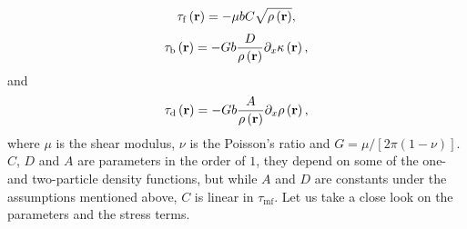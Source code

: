 \begin{equation} \label{eq:flow_stress}
{\tau _{\rm{f}}}\left( {\mathbf{r}} \right) =  - \mu bC\sqrt {\rho \left( {\mathbf{r}} \right)},
\end{equation}
\begin{equation}\label{eq:back_stress}
{\tau _{\rm{b}}}\left( {\mathbf{r}} \right) =  - Gb\frac{D}{{\rho \left( {\mathbf{r}} \right)}}{\partial _x}\kappa \left( {\mathbf{r}} \right),
\end{equation}
and 
\begin{equation}\label{eq:diff_stress}
{\tau _{\rm{d}}}\left( {\mathbf{r}} \right) =  - Gb\frac{A}{\rho \left( {\mathbf{r}} \right) }{\partial _x}\rho \left( {\mathbf{r}} \right),
\end{equation}
where $\mu$ is the shear modulus, $\nu$ is the Poisson's ratio and $G = \mu /\left[ {2\pi \left( {1 - \nu } \right)} \right]$. $C$, $D$ and $A$ are parameters in the order of $1$, they depend on some of the one- and two-particle density functions, but while $A$ and $D$ are constants under the assumptions mentioned above, $C$ is linear in ${\tau _{{\text{mf}}}}$. Let us take a close look on the parameters and the stress terms.
